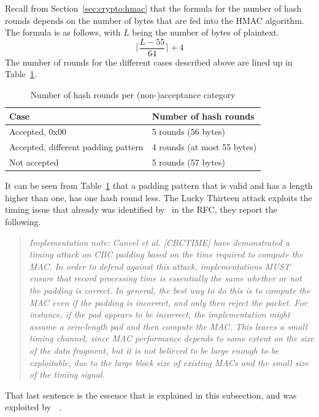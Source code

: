\documentclass[10pt,conference,a4paper]{IEEEtran}
\begin{document}
Recall from Section~\ref{sec:crypto:hmac} that the formula for the number of hash rounds depends on the number of bytes that are fed into the HMAC algorithm. The formula is as follows, with $L$ being the number of bytes of plaintext.
\[ \lceil \frac{L - 55}{64} \rceil + 4 \]
The number of rounds for the different cases described above are lined up in Table~\ref{sec:lucky:bandit:table}.
\begin{table}[h]
\begin{tabular}{l|l}
Case & Number of hash rounds  \\ \hline 
Accepted, $0\text{x}00$ & 5 rounds (56 bytes)  \\
Accepted, different padding pattern & 4 rounds (at most 55 bytes)  \\
Not accepted & 5 rounds (57 bytes) \\
\end{tabular}
\caption{Number of hash rounds per (non-)acceptance category}
\label{sec:lucky:bandit:table}
\end{table}
It can be seen from Table~\ref{sec:lucky:bandit:table} that a padding pattern that is valid and has a length higher than one, has one hash round less. The Lucky Thirteen attack exploits the timing issue that already was identified by~\citeauthor{ietf2008transport} in the RFC, they report the following.
\begin{quote}
\textit{Implementation note: Canvel et al. [CBCTIME] have demonstrated a timing attack on CBC padding based on the time required to compute the MAC.  In order to defend against this attack, implementations MUST ensure that record processing time is essentially the same whether or not the padding is correct.  In general, the best way to do this is to compute the MAC even if the padding is incorrect, and only then reject the packet.  For instance, if the pad appears to be incorrect, the implementation might assume a zero-length pad and then compute the MAC.  This leaves a small timing channel, since MAC performance depends to some extent on the size of the data fragment, but it is not believed to be large enough to be exploitable, due to the large block size of existing MACs and the small size of the timing signal.}
\end{quote}
That last sentence is the essence that is explained in this subsection, and was exploited by~\citeauthor{alfardan2013lucky}~\cite{alfardan2013lucky}.
\end{document}
